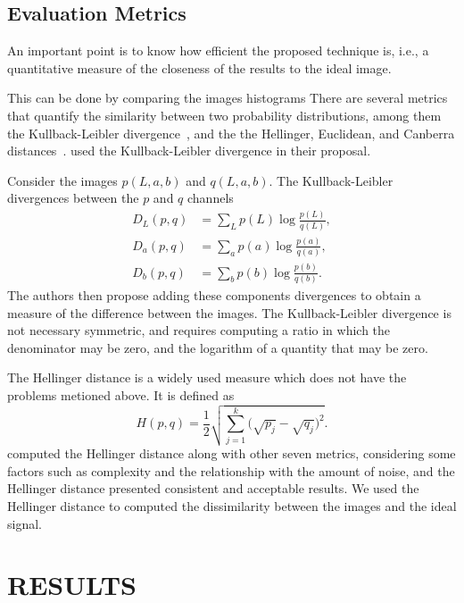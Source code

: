 \documentclass{article}
\begin{document}
\subsection{Evaluation Metrics}

An important point is to know how efficient the proposed technique is, i.e., a quantitative measure of the closeness of the results to the ideal image. 

This can be done by comparing the images histograms
There are several metrics that quantify the similarity between two probability distributions, among them the Kullback-Leibler divergence~\citep{AssessingInformationContentinColorImages}, and the
the Hellinger, 
Euclidean, and Canberra distances~\citep{BanchmarckSimiliraty}.
\citet{AssessingInformationContentinColorImages} used the Kullback-Leibler divergence in their proposal.

Consider the images $p(L, a, b)$ and $q(L, a, b)$.
The Kullback-Leibler divergences between the $p$ and $q$ channels
\begin{align}
D_{L}(p,q) & = \sum_{L} p(L) \log\frac{p(L)}{q(L)},\\
D_{a}(p,q) & = \sum_{a} p(a) \log\frac{p(a)}{q(a)},\\
D_{b}(p,q) & = \sum_{b} p(b) \log\frac{p(b)}{q(b)}.
\end{align}
The authors then propose adding these components divergences to obtain a measure of the difference between the images.
The Kullback-Leibler divergence is not necessary symmetric, and requires computing a ratio in which the denominator may be zero, and the logarithm of a quantity that may be zero.

The Hellinger distance is a widely used measure which does not have the problems metioned above.
It is defined as
\begin{equation}
	H(p, q) = \frac{1}{2}\sqrt{\sum_{j=1}^k \big(\sqrt{p_j} - \sqrt{q_j}\big)^2}.
\end{equation}
\citet{BanchmarckSimiliraty} computed the Hellinger distance along with other seven metrics, considering some factors such as complexity and the relationship with the amount of noise, and the Hellinger distance presented consistent and acceptable results.
We used the Hellinger distance to computed the dissimilarity between the images and the ideal signal.








\section{RESULTS}
\label{Sec:Results}
\end{document}
